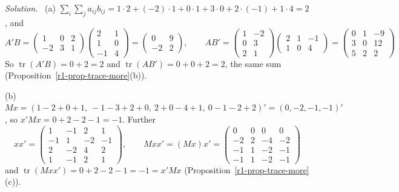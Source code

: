\documentclass[12pt]{article}
\DeclareMathOperator{\tr}{tr}
\theoremstyle{definition}
\newenvironment{solution}{\par\noindent\textit{Solution.}\ }{\par\smallskip}
\begin{document}
\begin{solution}
(a) \(\sum_i\sum_ja_{ij}b_{ij}=1\cdot2+(-2)\cdot1+0\cdot1+3\cdot0+2\cdot(-1)+1\cdot4=2\), and
\[
A'B=\begin{pmatrix}1&0&2\\-2&3&1\end{pmatrix}\begin{pmatrix}2&1\\1&0\\-1&4\end{pmatrix}=\begin{pmatrix}0&9\\-2&2\end{pmatrix},\qquad
AB'=\begin{pmatrix}1&-2\\0&3\\2&1\end{pmatrix}\begin{pmatrix}2&1&-1\\1&0&4\end{pmatrix}=\begin{pmatrix}0&1&-9\\3&0&12\\5&2&2\end{pmatrix}
\]
So \(\tr(A'B)=0+2=2\) and \(\tr(AB')=0+0+2=2\), the same sum (Proposition~\ref{r1-prop-trace-more}(b)).

(b) \(Mx=(1-2+0+1,\ -1-3+2+0,\ 2+0-4+1,\ 0-1-2+2)'=(0,-2,-1,-1)'\), so \(x'Mx=0+2-2-1=-1\). Further
\[
xx'=\begin{pmatrix}1&-1&2&1\\-1&1&-2&-1\\2&-2&4&2\\1&-1&2&1\end{pmatrix},\qquad
Mxx'=(Mx)x'=\begin{pmatrix}0&0&0&0\\-2&2&-4&-2\\-1&1&-2&-1\\-1&1&-2&-1\end{pmatrix}
\]
and \(\tr(Mxx')=0+2-2-1=-1=x'Mx\) (Proposition~\ref{r1-prop-trace-more}(c)).
\end{solution}
\end{document}
